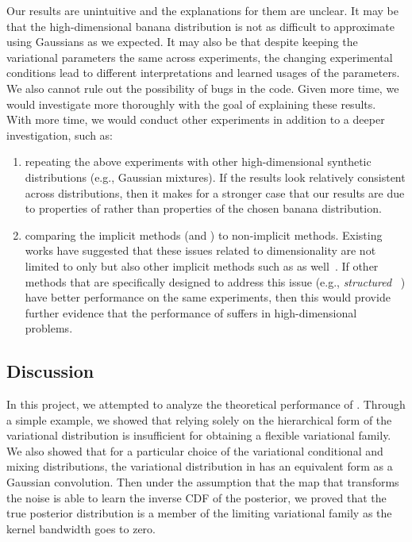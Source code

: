 \documentclass[10pt]{article}
\begin{document}
Our results are unintuitive and the explanations for them are unclear. It may be that the high-dimensional banana distribution is not as difficult to approximate using Gaussians as we expected. It may also be that despite keeping the variational parameters the same across experiments, the changing experimental conditions lead to different interpretations and learned usages of the parameters. We also cannot rule out the possibility of bugs in the code. Given more time, we would investigate more thoroughly with the goal of explaining these results.
\\

With more time, we would conduct other experiments in addition to a deeper investigation, such as:
\begin{enumerate}

\item
repeating the above experiments with other high-dimensional synthetic distributions (e.g., Gaussian mixtures). If the results look relatively consistent across distributions, then it makes for a stronger case that our results are due to properties of \uivi rather than properties of the chosen banana distribution.

\item
comparing the implicit \vi methods (\uivi and \sivi) to non-implicit \vi methods. Existing works have suggested that these issues related to dimensionality are not limited to only \uivi but also other implicit \vi methods such as \sivi as well~\citep{Molchanova:2019,Moens:2021}. If other methods that are specifically designed to address this issue (e.g., \textit{structured} \sivi~\citep{Molchanova:2019}) have better performance on the same experiments, then this would provide further evidence that the performance of \uivi suffers in high-dimensional problems.

\end{enumerate}


\subsection{Discussion} \label{sec:discussion}

In this project, we attempted to analyze the theoretical performance of \uivi. Through a simple example, we showed that relying solely on the hierarchical form of the variational distribution is insufficient for obtaining a flexible variational family. We also showed that for a particular choice of the variational conditional and mixing distributions, the variational distribution in \uivi has an equivalent form as a Gaussian convolution. Then under the assumption that the map that transforms the noise is able to learn the inverse CDF of the posterior, we proved that the true posterior distribution is a member of the limiting variational family as the kernel bandwidth goes to zero.
\\
\end{document}
